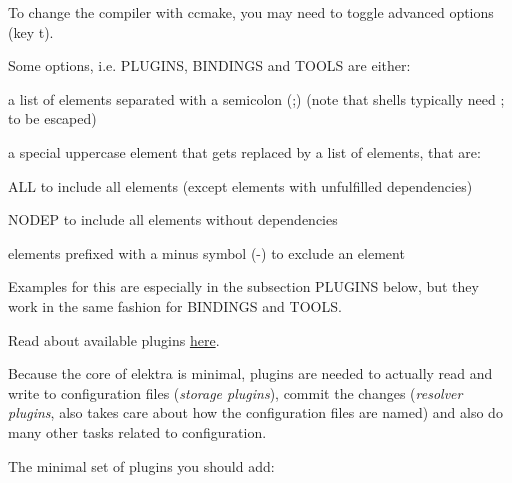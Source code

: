 \begin{DoxyCode}{0}
\end{DoxyCode}


To change the compiler with {\ttfamily ccmake}, you may need to toggle advanced options (key {\ttfamily t}).

Some options, i.\+e. {\ttfamily P\+L\+U\+G\+I\+NS}, {\ttfamily B\+I\+N\+D\+I\+N\+GS} and {\ttfamily T\+O\+O\+LS} are either\+:


\begin{DoxyItemize}
\item a list of elements separated with a semicolon ({\ttfamily ;}) (note that shells typically need {\ttfamily ;} to be escaped)
\item a special uppercase element that gets replaced by a list of elements, that are\+:
\begin{DoxyItemize}
\item {\ttfamily A\+LL} to include all elements (except elements with unfulfilled dependencies)
\item {\ttfamily N\+O\+D\+EP} to include all elements without dependencies
\end{DoxyItemize}
\item elements prefixed with a minus symbol ({\ttfamily -\/}) to exclude an element
\end{DoxyItemize}

Examples for this are especially in the subsection {\ttfamily P\+L\+U\+G\+I\+NS} below, but they work in the same fashion for {\ttfamily B\+I\+N\+D\+I\+N\+GS} and {\ttfamily T\+O\+O\+LS}.

Read about available plugins \mbox{\hyperlink{src_plugins_README_md}{here}}.

Because the core of elektra is minimal, plugins are needed to actually read and write to configuration files ({\itshape storage plugins}), commit the changes ({\itshape resolver plugins}, also takes care about how the configuration files are named) and also do many other tasks related to configuration.

The minimal set of plugins you should add\+:


